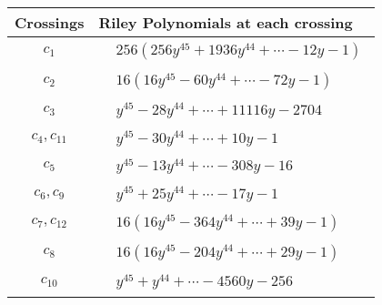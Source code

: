 \documentclass[1p]{elsarticle_modified}
\theoremstyle{definition}
\begin{document}
\begin{tabular}{m{50pt}|m{274pt}}
Crossings & \hspace{64pt}Riley Polynomials at each crossing \\
\hline $$\begin{aligned}c_{1}\end{aligned}$$&$\begin{aligned}
&256(256 y^{45}+1936 y^{44}+\cdots-12 y-1)
\end{aligned}$\\
\hline $$\begin{aligned}c_{2}\end{aligned}$$&$\begin{aligned}
&16(16 y^{45}-60 y^{44}+\cdots-72 y-1)
\end{aligned}$\\
\hline $$\begin{aligned}c_{3}\end{aligned}$$&$\begin{aligned}
&y^{45}-28 y^{44}+\cdots+11116 y-2704
\end{aligned}$\\
\hline $$\begin{aligned}c_{4},c_{11}\end{aligned}$$&$\begin{aligned}
&y^{45}-30 y^{44}+\cdots+10 y-1
\end{aligned}$\\
\hline $$\begin{aligned}c_{5}\end{aligned}$$&$\begin{aligned}
&y^{45}-13 y^{44}+\cdots-308 y-16
\end{aligned}$\\
\hline $$\begin{aligned}c_{6},c_{9}\end{aligned}$$&$\begin{aligned}
&y^{45}+25 y^{44}+\cdots-17 y-1
\end{aligned}$\\
\hline $$\begin{aligned}c_{7},c_{12}\end{aligned}$$&$\begin{aligned}
&16(16 y^{45}-364 y^{44}+\cdots+39 y-1)
\end{aligned}$\\
\hline $$\begin{aligned}c_{8}\end{aligned}$$&$\begin{aligned}
&16(16 y^{45}-204 y^{44}+\cdots+29 y-1)
\end{aligned}$\\
\hline $$\begin{aligned}c_{10}\end{aligned}$$&$\begin{aligned}
&y^{45}+y^{44}+\cdots-4560 y-256
\end{aligned}$\\
\hline
\end{tabular}\\~\\
\end{document}
